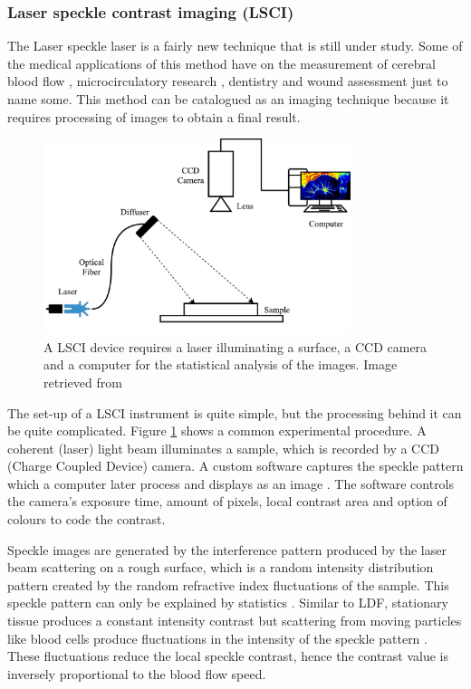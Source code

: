 \subsubsection{Laser speckle contrast imaging (LSCI)}
\label{section literature LSC}
The Laser speckle laser is a fairly new technique that is still under study. Some of the medical applications of this method have on the measurement of cerebral blood flow \cite{dunn2001dynamic}, microcirculatory research \cite{domoki2012evaluation}, dentistry \cite{stoianovici2011assessment} and wound assessment \cite{stewart2005comparison} just to name some. This method can be catalogued as an imaging technique because it requires processing of images to obtain a final result. 

\begin{figure}[!htpb]
	\centering
	\includegraphics[width=0.8\textwidth,keepaspectratio]{lsci}    
	\caption[Setup of a Laser speckle contrast imaging]{A LSCI device requires a laser illuminating a surface, a CCD camera and a computer for the statistical analysis of the images. Image retrieved from \cite{son2013contrast}}
	\label{fig:LSCI}
\end{figure}


The set-up of a LSCI instrument is quite simple, but the processing behind it can be quite complicated. Figure \ref{fig:LSCI} shows a common experimental procedure. A coherent (laser) light beam illuminates a sample, which is recorded by a CCD (Charge Coupled Device) camera. A custom software captures the speckle pattern which a computer later process and displays as an image \cite{jayanthy2011measuring, son2013contrast, duncan2008can}. The software controls the camera's exposure time, amount of pixels, local contrast area and option of colours to code the contrast. 

Speckle images are generated by the interference pattern produced by the laser beam scattering on a rough surface, which is a random intensity distribution pattern created by the random refractive index fluctuations of the sample. This speckle pattern can only be explained by statistics \cite{goodman1975statistical}. Similar to LDF, stationary tissue produces a constant intensity contrast but scattering from moving particles like blood cells produce fluctuations in the intensity of the speckle pattern \cite{son2013contrast}. These fluctuations reduce the local speckle contrast, hence the contrast value is inversely proportional to the blood flow speed. 

